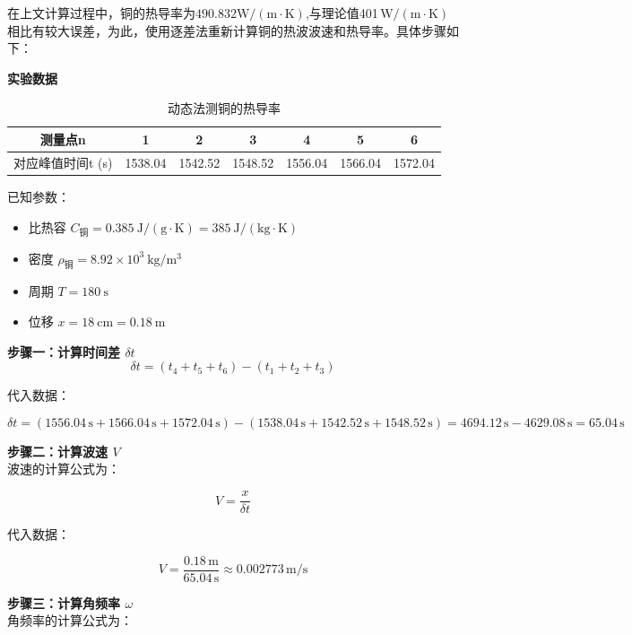 \documentclass[zihao=5, UTF8]{article}
\theoremstyle{MyLineTheoremStyle} %
\theoremstyle{MyBlockTheoremStyle} %
\theoremstyle{MySubsubsectionStyle} %
\begin{document}
在上文计算过程中，铜的热导率为$490.832 \mathrm{W/(m \cdot K)}$,与理论值401\,$\mathrm{W/(m \cdot K)}$相比有较大误差，为此，使用逐差法重新计算铜的热波波速和热导率。具体步骤如下：

\textbf{实验数据} \\

\begin{table}[H]
    \centering
    \begin{tabular}{|c|c|c|c|c|c|c|}
    \hline
        测量点n & 1 & 2 & 3 & 4 & 5 & 6 \\ \hline
        对应峰值时间t (s) & 1538.04 & 1542.52 & 1548.52 & 1556.04 & 1566.04 & 1572.04 \\ \hline
    \end{tabular}
    \caption{动态法测铜的热导率}
\end{table}

已知参数：
\begin{itemize}
    \item 比热容 \( C_{\text{铜}} = 0.385\ \mathrm{J/(g \cdot K)} = 385\ \mathrm{J/(kg \cdot K)} \)
    \item 密度 \( \rho_{\text{铜}} = 8.92 \times 10^3\ \mathrm{kg/m^3} \)
    \item 周期 \( T = 180\ \mathrm{s} \)
    \item 位移 \( x = 18\ \mathrm{cm} = 0.18\ \mathrm{m} \)
\end{itemize}

\textbf{步骤一：计算时间差 \( \delta t \)} \\

\[
\delta t = (t_4 + t_5 + t_6) - (t_1 + t_2 + t_3)
\]

代入数据：

\[
\delta t = (1556.04\,\text{s} + 1566.04\,\text{s} + 1572.04\,\text{s}) - (1538.04\,\text{s} + 1542.52\,\text{s} + 1548.52\,\text{s}) = 4694.12\,\text{s} - 4629.08\,\text{s} = 65.04\,\text{s}
\]

\textbf{步骤二：计算波速 \( V \)} \\

波速的计算公式为：

\[
V = \frac{x}{\delta t}
\]

代入数据：

\[
V = \frac{0.18\,\mathrm{m}}{65.04\,\mathrm{s}} \approx 0.002773\,\mathrm{m/s}
\]

\textbf{步骤三：计算角频率 \( \omega \)} \\

角频率的计算公式为：
\end{document}
